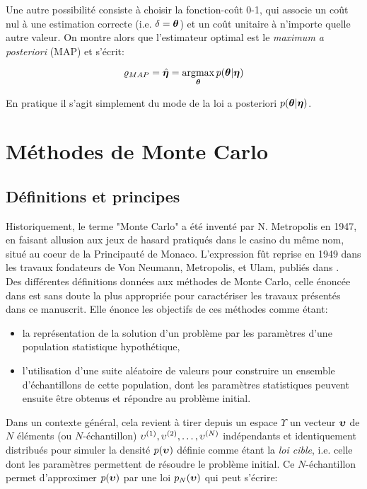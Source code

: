 Une autre possibilité consiste à choisir la fonction-coût 0-1, qui associe un coût nul à une estimation correcte (i.e. $\delta = {\bm{\theta}}$) et un coût unitaire à n'importe quelle autre valeur. On montre alors que l'estimateur optimal est le \textit{maximum a posteriori} (MAP) et s'écrit: 

\begin{equation}
\varrho_{MAP} = \hat{{\bm{\eta}}} = \operatorname*{\arg\!\max}_{{\bm{\theta}}} {p({\bm{\theta}} | {\bm{\eta}})}
\label{eq_definition_map}
\end{equation}

En pratique il s'agit simplement du mode de la loi a posteriori ${p({\bm{\theta}} | {\bm{\eta}})}$.\\

\section{Méthodes de Monte Carlo}

\subsection{Définitions et principes}

Historiquement, le terme "Monte Carlo" a été inventé par N. Metropolis en 1947, en faisant allusion aux jeux de hasard pratiqués dans le casino du même nom, situé au coeur de la Principauté de Monaco. L'expression fût reprise en 1949 dans les travaux fondateurs de Von Neumann, Metropolis, et Ulam, publiés dans \cite{Metropolis1949}.\\

Des différentes définitions données aux méthodes de Monte Carlo, celle énoncée dans \cite{Halton1970} est sans doute la plus appropriée pour caractériser les travaux présentés dans ce manuscrit. Elle énonce les objectifs de ces méthodes comme étant: \\

\begin{itemize}
	\item la représentation de la solution d'un problème par les paramètres d'une population statistique hypothétique,
	\item l'utilisation d'une suite aléatoire de valeurs pour construire un ensemble d'échantillons de cette population, dont les paramètres statistiques peuvent ensuite être obtenus et répondre au problème initial.\\
\end{itemize}
	
Dans un contexte général, cela revient à tirer depuis un espace $\Upsilon$ un vecteur ${\bm{\upsilon}}$ de $N$ éléments (ou $N$-échantillon) ${\upsilon}^{(1)}, {\upsilon}^{(2)}, \dots, {\upsilon}^{(N)}$ indépendants et identiquement distribués pour simuler la densité $p({\bm{\upsilon}})$ définie comme étant la \textit{loi cible}, i.e. celle dont les paramètres permettent de résoudre le problème initial. Ce $N$-échantillon permet d'approximer $p({\bm{\upsilon}})$ par une loi $p_N({\bm{\upsilon}})$ qui peut s'écrire:

